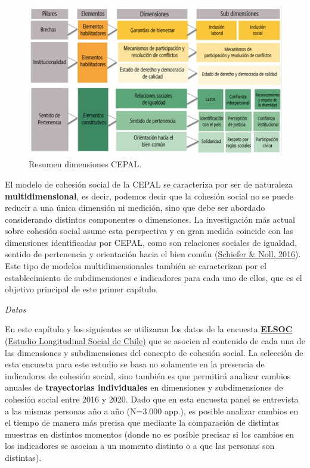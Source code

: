 \documentclass[
  12pt,
]{book}
\begin{document}
\begin{figure}[H]

{\centering \includegraphics[width=1\linewidth,height=1\textheight]{images/dimensiones-cepal} 

}

\caption{Resumen dimensiones CEPAL.}\label{fig:esquema-cepal}
\end{figure}

El modelo de cohesión social de la CEPAL se caracteriza por ser de naturaleza \textbf{multidimensional}, es decir, podemos decir que la cohesión social no se puede reducir a una única dimensión ni medición, sino que debe ser abordado considerando distintos componentes o dimensiones. La investigación más actual sobre cohesión social asume esta perspectiva y en gran medida coincide con las dimensiones identificadas por CEPAL, como son relaciones sociales de igualdad, sentido de pertenencia y orientación hacia el bien común (\protect\hyperlink{ref-schiefer_essentials_2016}{Schiefer \& Noll, 2016}). Este tipo de modelos multidimensionales también se caracterizan por el establecimiento de subdimensiones e indicadores para cada uno de ellos, que es el objetivo principal de este primer capítulo.

\emph{Datos}

En este capítulo y los siguientes se utilizaran los datos de la encuesta \href{https://coes.cl/encuesta-panel/}{\textbf{ELSOC} (Estudio Longitudinal Social de Chile)} que se asocien al contenido de cada una de las dimensiones y subdimensiones del concepto de cohesión social. La selección de esta encuesta para este estudio se basa no solamente en la presencia de indicadores de cohesión social, sino también es que permitirá analizar cambios anuales de \textbf{trayectorias individuales} en dimensiones y subdimensiones de cohesión social entre 2016 y 2020. Dado que en esta encuesta panel se entrevista a las mismas personas año a año (N=3.000 app.), es posible analizar cambios en el tiempo de manera más precisa que mediante la comparación de distintas muestras en distintos momentos (donde no es posible precisar si los cambios en los indicadores se asocian a un momento distinto o a que las personas son distintas).
\end{document}
